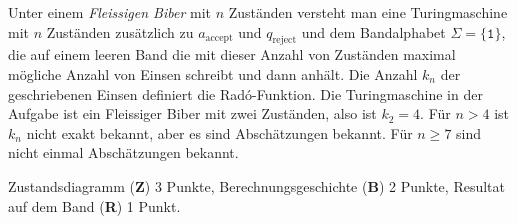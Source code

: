 \begin{diskussion}
Unter einem {\em Fleissigen Biber} mit $n$ Zuständen versteht
man eine Turingmaschine mit $n$ Zuständen zusätzlich zu $a_{\text{accept}}$
und $q_{\text{reject}}$ und dem Bandalphabet $\Sigma=\{\texttt{1}\}$,
die auf einem leeren Band die mit dieser Anzahl von Zuständen maximal
mögliche Anzahl von Einsen schreibt und dann anhält.
Die Anzahl $k_n$ der geschriebenen Einsen definiert die Rad\'o-Funktion.
Die Turingmaschine in der Aufgabe ist ein Fleissiger Biber mit zwei Zuständen,
also ist $k_2=4$.
Für $n>4$ ist $k_n$ nicht exakt bekannt, aber es sind Abschätzungen bekannt.
Für $n\ge 7$ sind nicht einmal Abschätzungen bekannt.
\end{diskussion}

\begin{bewertung}
Zustandsdiagramm ({\bf Z}) 3 Punkte,
Berechnungsgeschichte ({\bf B}) 2 Punkte,
Resultat auf dem Band ({\bf R}) 1 Punkt.
\end{bewertung}
